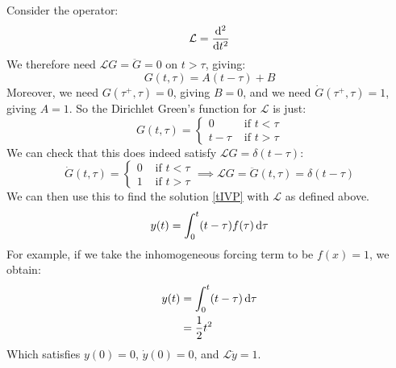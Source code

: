 \documentclass[../main.tex]{subfiles}
\begin{document}
\begin{example}
  Consider the operator:
  \[
    \mathcal{L} = \deriv[2]{}{t}
  \]
  We therefore need $\mathcal{L}G = \ddot{G} = 0$ on $t > \tau$, giving:
  \[
    G(t, \tau) = A(t - \tau) + B
  \]
  Moreover, we need $G(\tau^{+}, \tau) = 0$, giving $B = 0$, and we need $\dot{G}(\tau^{+}, \tau) = 1$, giving $A = 1$.
  So the Dirichlet Green's function for $\mathcal{L}$ is just:
  \[
    G(t, \tau) = \begin{cases}
    0 & \text{ if } t < \tau \\
    t - \tau & \text{ if } t > \tau
    \end{cases}
  \]
  We can check that this does indeed satisfy $\mathcal{L}G = \delta(t - \tau)$:
  \[
    \dot{G}(t, \tau) = \begin{cases}
    0 & \text{ if } t < \tau \\
    1 & \text{ if } t > \tau
    \end{cases} \implies \mathcal{L}G = \ddot{G}(t, \tau) = \delta(t - \tau)
  \]
  We can then use this to find the solution \cref{tIVP} with $\mathcal{L}$ as defined above.
  \[
    y(t) = \int_{0}^{t} (t - \tau) f(\tau) \d{\tau}
  \]
  For example, if we take the inhomogeneous forcing term to be $f(x) = 1$, we obtain:
  \begin{align*}
    y(t) &= \int_{0}^{t} (t - \tau) \d{\tau} \\
         &= \frac{1}{2}t^2
  \end{align*}
  Which satisfies $y(0) = 0$, $\dot{y}(0) = 0$, and $\mathcal{L}\ddot{y} = 1$.
\end{example}
\end{document}
